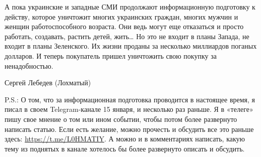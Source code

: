 А пока украинские и западные СМИ продолжают информационную подготовку к
действу, которое уничтожит многих украинских граждан, многих мужчин и женщин
работоспособного возраста. Они ведь могут еще отказаться и просто работать,
создавать, растить детей, жить… Но это не входит в планы Запада, не входит в
планы Зеленского. Их жизни проданы за несколько миллиардов поганых долларов. И
теперь покупатель пришел уничтожить свою покупку за ненадобностью.

Сергей Лебедев (Лохматый)

P.S.: О том, что за информационная подготовка проводится в настоящее время, я
писал в своем Telegram-канале 15 января, и несколько раз раньше. Я в «телеге»
пишу свое мнение о том или ином событии, чтобы потом более развернуто написать
статью. Если есть желание, можно прочесть и обсудить все это раньше здесь:
\url{https://t.me/L0HMATIY}. А можно и в комментариях написать, какую тему из
поднятых в канале хотелось бы более развернуто описать и обсудить.
